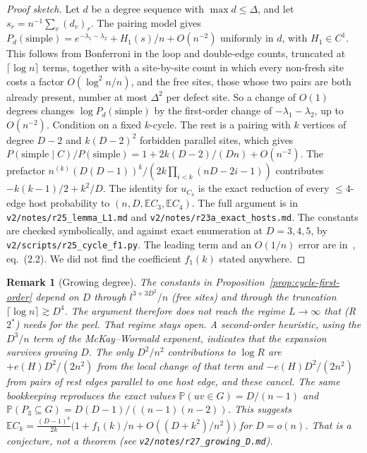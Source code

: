 \documentclass[11pt]{article}
\newtheorem{remark}[theorem]{Remark}
\newcommand{\EE}{\mathbb{E}}
\newcommand{\PP}{\mathbb{P}}
\begin{document}
\begin{proof}[Proof sketch]
Let \(d\) be a degree sequence with \(\max d\le\Delta\), and let
\(s_r=n^{-1}\sum_v(d_v)_r\). The pairing model gives
\(P_d(\text{simple})=e^{-\lambda_1-\lambda_2}+H_1(s)/n+O(n^{-2})\) uniformly in
\(d\), with \(H_1\in C^1\). This follows from Bonferroni in the loop and
double-edge counts, truncated at \(\lceil\log n\rceil\) terms, together with a
site-by-site count in which every non-fresh site costs a factor \(O(\log^2n/n)\),
and the free sites, those whose two pairs are both already present, number at
most \(\Delta^2\) per defect site. So a change of \(O(1)\) degrees changes
\(\log P_d(\text{simple})\) by the first-order change of
\(-\lambda_1-\lambda_2\), up to \(O(n^{-2})\). Condition on a fixed \(k\)-cycle.
The rest is a pairing with \(k\) vertices of degree \(D-2\) and \(k(D-2)^2\)
forbidden parallel sites, which gives
\(P(\mathrm{simple}\mid C)/P(\mathrm{simple})=1+2k(D-2)/(Dn)+O(n^{-2})\). The
prefactor \(n^{(k)}(D(D-1))^k/(2k\prod_{i<k}(nD-2i-1))\) contributes
\(-k(k-1)/2+k^2/D\). The identity for \(u_{C_4}\) is the exact reduction of
every \(\le4\)-edge host probability to \((n,D,\EE C_3,\EE C_4)\). The full
argument is in \texttt{v2/notes/r25\_lemma\_L1.md} and
\texttt{v2/notes/r23a\_exact\_hosts.md}. The constants are checked symbolically,
and against exact enumeration at \(D=3,4,5\), by
\texttt{v2/scripts/r25\_cycle\_f1.py}. The leading term and an \(O(1/n)\) error
are in~\cite{MWW04}, eq.~(2.2). We did not find the coefficient \(f_1(k)\)
stated anywhere.
\end{proof}

\begin{remark}[Growing degree]
The constants in Proposition~\ref{prop:cycle-first-order} depend on \(D\)
through \(l^{3+3D^2}/n\) (free sites) and through the truncation
\(\lceil\log n\rceil\gtrsim D^4\). The argument therefore does not reach the
regime \(L\to\infty\) that (R\(2^*\)) needs for the peel. That regime stays
open.
A second-order heuristic, using the \(D^3/n\) term of the McKay--Wormald
exponent, indicates that the expansion survives growing \(D\). The only
\(D^2/n^2\) contributions to \(\log R\) are \(+e(H)D^2/(2n^2)\) from the local
change of that term and \(-e(H)D^2/(2n^2)\) from pairs of rest edges parallel to
one host edge, and these cancel. The same bookkeeping reproduces the exact
values \(\PP(uv\in G)=D/(n-1)\) and
\(\PP(P_3\subseteq G)=D(D-1)/((n-1)(n-2))\). This suggests
\(\EE C_k=\frac{(D-1)^k}{2k}\bigl(1+f_1(k)/n+O((D+k^2)/n^2)\bigr)\) for
\(D=o(n)\). That is a conjecture, not a theorem (see
\texttt{v2/notes/r27\_growing\_D.md}).
\end{remark}
\end{document}
